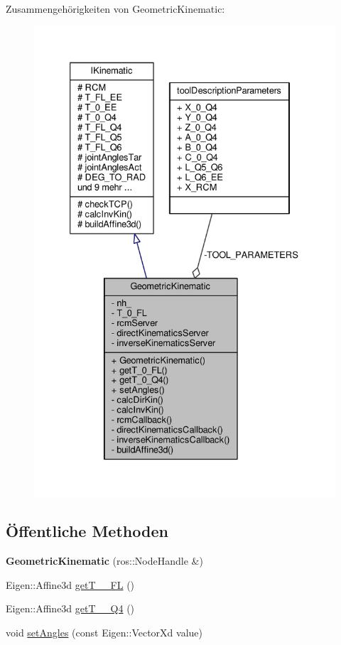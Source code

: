 Zusammengehörigkeiten von Geometric\-Kinematic\-:
\nopagebreak
\begin{figure}[H]
\begin{center}
\leavevmode
\includegraphics[width=333pt]{classGeometricKinematic__coll__graph}
\end{center}
\end{figure}
\subsection*{Öffentliche Methoden}
\begin{DoxyCompactItemize}
\item 
\hypertarget{classGeometricKinematic_ae9cf7464a179ef36352f1eba1d21999b}{{\bfseries Geometric\-Kinematic} (ros\-::\-Node\-Handle \&)}\label{classGeometricKinematic_ae9cf7464a179ef36352f1eba1d21999b}

\item 
Eigen\-::\-Affine3d \hyperlink{classGeometricKinematic_a2780149e9cc27767a216952be3c4efa1}{get\-T\-\_\-\_\-\-F\-L} ()
\item 
Eigen\-::\-Affine3d \hyperlink{classGeometricKinematic_af17c2b463d3fa83ec26fb4b4d5abb64c}{get\-T\-\_\-\_\-\-Q4} ()
\item 
void \hyperlink{classGeometricKinematic_a985dc4eb67fb7989226d5b8d0ed2f9bf}{set\-Angles} (const Eigen\-::\-Vector\-Xd value)
\end{DoxyCompactItemize}
